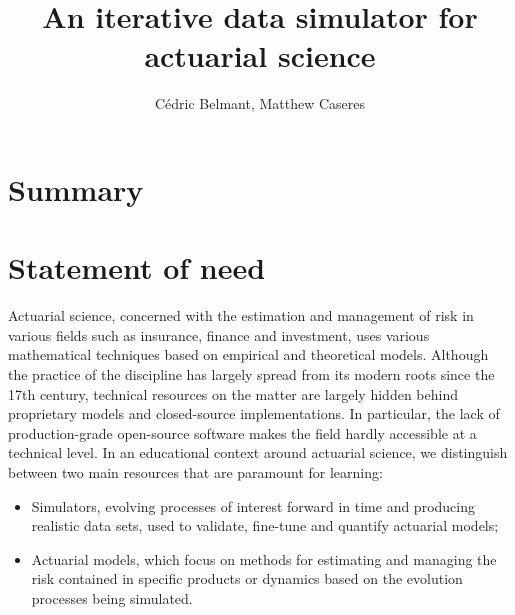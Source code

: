\documentclass{article}
\title{An iterative data simulator for actuarial science}
\author{Cédric Belmant, Matthew Caseres}
\begin{document}
\maketitle

\section*{Summary}

\section*{Statement of need}

Actuarial science, concerned with the estimation and management of risk in various fields such as insurance, finance and investment, uses various mathematical techniques based on empirical and theoretical models. Although the practice of the discipline has largely spread from its modern roots since the 17th century, technical resources on the matter are largely hidden behind proprietary models and closed-source implementations. In particular, the lack of production-grade open-source software makes the field hardly accessible at a technical level. In an educational context around actuarial science, we distinguish between two main resources that are paramount for learning:

\begin{itemize}
    \item Simulators, evolving processes of interest forward in time and producing realistic data sets, used to validate, fine-tune and quantify actuarial models;
    \item Actuarial models, which focus on methods for estimating and managing the risk contained in specific products or dynamics based on the evolution processes being simulated.
\end{itemize}
\end{document}
